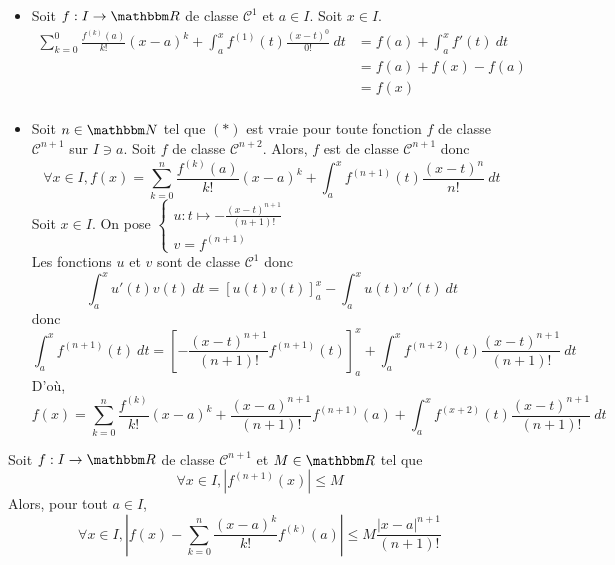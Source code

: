 \begin{prv}
	\begin{itemize}
		\item Soit $f: I \to \R$ de classe $\mathcal{C}^1$ et $a \in I$. Soit $x \in I$.
			\begin{align*}
				\sum_{k=0}^{0} \frac{f^{(k)}(a)}{k!}(x-a)^k + \int_{a}^{x} f^{(1)}(t) \frac{(x-t)^0}{0!} ~ dt
				&= f(a) + \int_{a}^{x} f'(t)~dt \\
				&= f(a) + f(x) - f(a) \\
				&= f(x) \\
			\end{align*}
		\item Soit $n\in \N$ tel que $(*)$ est vraie pour toute fonction $f$ de classe $\mathcal{C}^{n+1}$ sur $I \ni a$.
			Soit $f$ de classe $\mathcal{C}^{n+2}$. Alors, $f$ est de classe $\mathcal{C}^{n+1}$ donc \[
				\forall x \in I, f(x) = \sum_{k=0}^{n} \frac{f^{(k)}(a)}{k!}(x-a)^k
				+ \int_{a}^{x} f^{(n+1)}(t) \frac{(x-t)^n}{n!}~ dt
			\] Soit $x \in I$.
			On pose $\begin{cases}
				u: t \mapsto -\frac{(x-t)^{n+1}}{(n+1)!}\\
				v = f^{(n+1)}
			\end{cases}$\\
			Les fonctions $u$ et $v$ sont de classe $\mathcal{C}^1$ donc \[
				\int_{a}^{x} u'(t)v(t)~dt = \left[ u(t)v(t) \right]_a^x - \int_{a}^{x} u(t)v'(t)~dt  
			\] donc  \[
				\int_{a}^{x} f^{(n+1)}(t)~dt = \left[ -\frac{(x-t)^{n+1}}{(n+1)!} f^{(n+1)}(t)\right]^x_a + \int_{a}^{x} f^{(n+2)}(t) \frac{(x-t)^{n+1}}{(n+1)!}~dt
			\]
			D'où, \[
				f(x) = \sum_{k=0}^{n} \frac{f^{(k)}}{k!}(x-a)^{k} + \frac{(x-a)^{n+1}}{(n+1)!} f^{(n+1)}(a) + \int_{a}^{x} f^{(x+2)}(t) \frac{(x-t)^{n+1}}{(n+1)!} ~dt 
			\] 
	\end{itemize}
\end{prv}

\begin{prop}
	Soit $f: I \to \R$ de classe $\mathcal{C}^{n+1}$ et $M \in \R$ tel que \[
		\forall x \in I, \left| f^{(n+1)}(x) \right| \le M
	\] Alors, pour tout $a \in I$, \[
		\forall x \in I, \left| f(x) - \sum_{k=0}^{n} \frac{(x-a)^k}{k!} f^{(k)}(a) \right| \le M \frac{\left| x-a \right|^{n+1}}{(n+1)!}
	\]
\end{prop}

